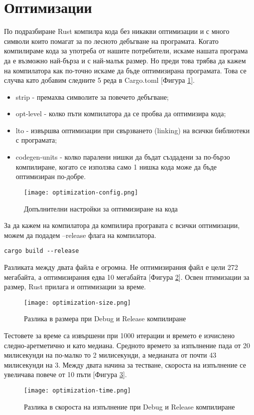\section{Оптимизации}
По подразбиране Rust компилра кода без никакви оптимизации и с много символи
които помагат за по лесното дебъгване на програмата. Когато компилираме кода
за употреба от нашите потребители, искаме нашата програма да е възможно
най-бърза и с най-малък размер. Но преди това трябва да кажем на компилатора
как по-точно искаме да бъде оптимизирана програмата. Това се случва като добавим
следните 5 реда в Cargo.toml [Фигура \ref{fig:optimization-config}].
\begin{itemize}
    \item strip - премахва символите за повечето дебъгване;
    \item opt-level - колко пъти компилатора да се пробва да оптимизира кода;
    \item lto - извършва оптимизации при свързването (linking) на всички библиотеки с програмата;
    \item codegen-units - колко паралени нишки да бъдат създадени за по-бързо компилиране, когато се използва само 1 нишка кода може да бъде оптимизиран по-добре.
\end{itemize}

\begin{figure}[!htb]
  \texttt{[image: optimization-config.png]}
  \centering
  \caption{Допълнителни настройки за оптимизиране на кода}
  \label{fig:optimization-config}
\end{figure}

За да кажем на компилатора да компилира програвата с всички оптимизации, можем
да подадем --release флага на компилатора.
\begin{lstlisting}
cargo build --release
\end{lstlisting}

Разликата между двата файла е огромна. Не оптимизирания файл е цели 272
мегабайта, а оптимизирания едва 10 мегабайта [Фигура
\ref{fig:optimization-size}]. Освен птимизации за размер, Rust прилага и
оптимизации за време. 

\begin{figure}[!htb]
  \texttt{[image: optimization-size.png]}
  \centering
  \caption{Разлика в размера при Debug и Release компилиране}
  \label{fig:optimization-size}
\end{figure}

Тестовете за време са извършени при 1000 итерации и времето е изчислено
следно-аретметично и като медиана. Средното времето за изпълнение пада от 20
милисекунди на по-малко то 2 милисекунди, а медианата от почти 43 милисекунди
на 3. Между двата начина за тестване, скороста на изпълнение се увеличава
повече от 10 пъти [Фигура \ref{fig:optimization-time}].

\begin{figure}[!htb]
  \texttt{[image: optimization-time.png]}
  \centering
  \caption{Разлика в скороста на изпълнение при Debug и Release компилиране}
  \label{fig:optimization-time}
\end{figure}
